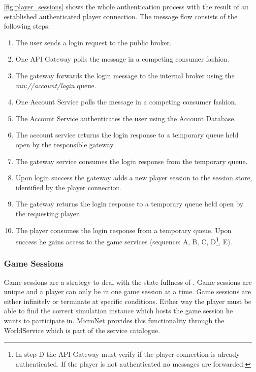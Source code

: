 \autoref{fig:player_sessions} shows the whole authentication process with the
result of an established authenticated player connection. The message flow
consists of the following steps:

\begin{enumerate}
  \item The user sends a login request to the public broker.
  \item One API Gateway polls the message in a competing consumer fashion.
  \item The gateway forwards the login message to the internal broker using the
  \textit{mn://account/login} queue.
  \item One Account Service polls the message in a competing consumer fashion.
  \item The Account Service authenticates the user using the Account Database.
  \item The account service returns the login response to a temporary queue held
  open by the responsible gateway.
  \item The gateway service consumes the login response from the temporary
  queue.
  \item Upon login success the gateway adds a new player session to the session
  store, identified by the player connection.
  \item The gateway returns the login response to a temporary queue held open by
  the requesting player.
  \item The player consumes the login response from a temporary queue. Upon
  success he gains access to the game services (sequence: A, B, C, D\footnote{In
  step D the API Gateway must verify if the player connection is already
  authenticated. If the player is not authenticated no messages are forwarded.},
  E).
\end{enumerate}



\subsubsection{Game Sessions}

Game sessions are a strategy to deal with the state-fullness of \ogs{}. Game
sessions are unique and a player can only be in one game session at a time. Game
sessions are either infinitely or terminate at specific conditions. Either way
the player must be able to find the correct simulation instance which hosts the
game session he wants to participate in. MicroNet provides this functionality
through the WorldService which is part of the service catalogue.

